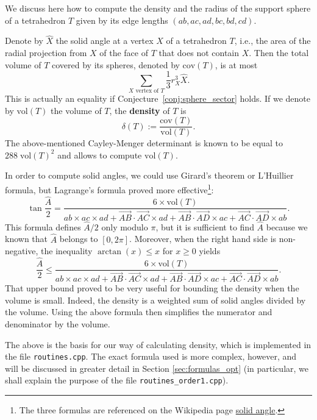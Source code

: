 \documentclass[11pt]{article}
\begin{document}
We discuss here how to compute the density and the radius of the support sphere of a tetrahedron $T$ given by its edge lengths $(ab,ac,ad,bc,bd,cd)$.

Denote by $\widehat{X}$ the solid angle at a vertex $X$ of a tetrahedron $T$, i.e., the area of the radial projection from $X$ of the face of $T$ that does not contain $X$.
Then the total volume of $T$ covered by its spheres, denoted by $\textrm{cov}(T)$, is at most
\[
\sum_{X\textrm{ vertex of }T} \frac{1}{3}r_X^3\widehat{X}.
\]
This is actually an equality if Conjecture~\ref{conj:sphere_sector} holds.
If we denote by $\textrm{vol}(T)$ the volume of $T$, the {\bf density} of $T$ is
\[
\delta(T):=\frac{\textrm{cov}(T)}{\textrm{vol}(T)}.
\]
The above-mentioned Cayley-Menger determinant is known to be equal to $288\;\textrm{vol}(T)^2$ and allows to compute $\textrm{vol}(T)$.

In order to compute solid angles, we could use Girard's theorem or L'Huillier formula, but Lagrange's formula proved more effective\footnote{The three formulas are referenced on the Wikipedia page \href{https://en.wikipedia.org/wiki/Solid_angle}{solid angle}.}:
\[
\tan\frac{\widehat{A}}{2}=
\frac{6\times \textrm{vol}(T)}{
ab\times ac\times ad+
\overrightarrow{AB}\cdotp\overrightarrow{AC}\times ad+
\overrightarrow{AB}\cdotp\overrightarrow{AD}\times ac+
\overrightarrow{AC}\cdotp\overrightarrow{AD}\times ab
}.
\]
This formula defines $\widehat{A}/2$ only modulo $\pi$, but it is sufficient to find $\widehat{A}$ because we known that $\widehat{A}$ belongs to $[0,2\pi]$.
Moreover, when the right hand side is non-negative, the inequality $\arctan(x)\leq x$ for $x\geq 0$ yields
\[
\frac{\widehat{A}}{2}\leq 
\frac{6\times \textrm{vol}(T)}{
ab\times ac\times ad+
\overrightarrow{AB}\cdotp\overrightarrow{AC}\times ad+
\overrightarrow{AB}\cdotp\overrightarrow{AD}\times ac+
\overrightarrow{AC}\cdotp\overrightarrow{AD}\times ab
}.
\]
That upper bound proved to be very useful for bounding the density when the volume is small.
Indeed, the density is a weighted sum of solid angles divided by the volume.
Using the above formula then simplifies the numerator and denominator by the volume.

The above is the basis for our way of calculating density, which is implemented in the file \verb+routines.cpp+.
The exact formula used is more complex, however, and will be discussed in greater detail in Section \ref{sec:formulas_opt} (in particular, we shall explain the purpose of the file \verb+routines_order1.cpp+).
\end{document}

